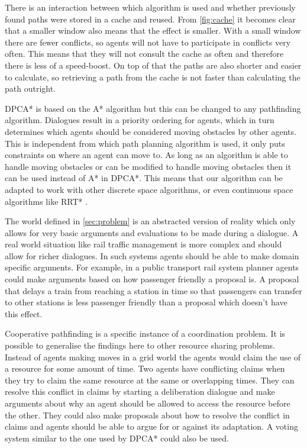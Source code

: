 
There is an interaction between which algorithm is used and whether previously
found paths were stored in a cache and reused. From \autoref{fig:cache} it
becomes clear that a smaller window also means that the effect is smaller. With
a small window there are fewer conflicts, so agents will not have to
participate in conflicts very often. This means that they will not consult the
cache as often and therefore there is less of a speed-boost. On top of that the
paths are also shorter and easier to calculate, so retrieving a path from the
cache is not faster than calculating the path outright.

DPCA* is based on the A* algorithm \cite{hart1968} but this can be changed to
any pathfinding algorithm. Dialogues result in a priority ordering for agents,
which in turn determines which agents should be considered moving obstacles by
other agents. This is independent from which path planning algorithm is used,
it only puts constraints on where an agent can move to. As long as an algorithm
is able to handle moving obstacles or can be modified to handle moving
obstacles then it can be used instead of A* in DPCA*. This means that our
algorithm can be adapted to work with other discrete space algorithms, or even
continuous space algorithms like RRT* \cite{lavalle1998,lavalle2001}.

The world defined in \autoref{sec:problem} is an abstracted version of reality
which only allows for very basic arguments and evaluations to be made during a
dialogue. A real world situation like rail traffic management is more complex
and should allow for richer dialogues. In such systems agents should be able to
make domain specific arguments. For example, in a public transport rail system
planner agents could make arguments based on how passenger friendly a proposal
is. A proposal that delays a train from reaching a station in time so that
passengers can transfer to other stations is less passenger friendly than a
proposal which doesn't have this effect.

Cooperative pathfinding is a specific instance of a coordination problem. It is
possible to generalise the findings here to other resource sharing problems.
Instead of agents making moves in a grid world the agents would claim the use
of a resource for some amount of time. Two agents have conflicting claims when
they try to claim the same resource at the same or overlapping times. They can
resolve this conflict in claims by starting a deliberation dialogue and make
arguments about why an agent should be allowed to access the resource before
the other. They could also make proposals about how to resolve the conflict in
claims and agents should be able to argue for or against its adaptation. A
voting system similar to the one used by DPCA* could also be used.

